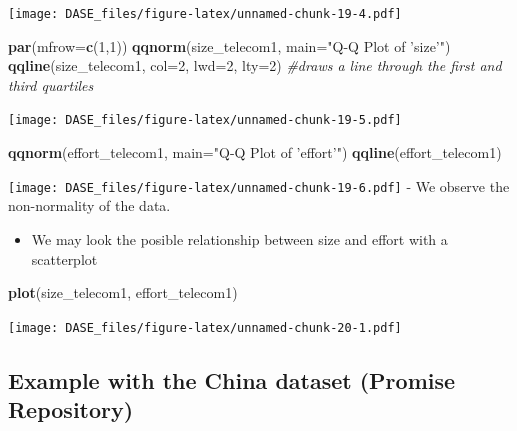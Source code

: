 \documentclass[]{book}
\newenvironment{Shaded}{\begin{snugshade}}{\end{snugshade}}
\newcommand{\KeywordTok}[1]{\textcolor[rgb]{0.13,0.29,0.53}{\textbf{{#1}}}}
\newcommand{\DataTypeTok}[1]{\textcolor[rgb]{0.13,0.29,0.53}{{#1}}}
\newcommand{\DecValTok}[1]{\textcolor[rgb]{0.00,0.00,0.81}{{#1}}}
\newcommand{\StringTok}[1]{\textcolor[rgb]{0.31,0.60,0.02}{{#1}}}
\newcommand{\CommentTok}[1]{\textcolor[rgb]{0.56,0.35,0.01}{\textit{{#1}}}}
\newcommand{\NormalTok}[1]{{#1}}
\providecommand{\tightlist}{%
  \setlength{\itemsep}{0pt}\setlength{\parskip}{0pt}}
\begin{document}
\texttt{[image: DASE\_files/figure-latex/unnamed-chunk-19-4.pdf]}

\begin{Shaded}
\begin{Highlighting}[]
\KeywordTok{par}\NormalTok{(}\DataTypeTok{mfrow=}\KeywordTok{c}\NormalTok{(}\DecValTok{1}\NormalTok{,}\DecValTok{1}\NormalTok{))}
\KeywordTok{qqnorm}\NormalTok{(size_telecom1, }\DataTypeTok{main=}\StringTok{"Q-Q Plot of 'size'"}\NormalTok{)}
\KeywordTok{qqline}\NormalTok{(size_telecom1, }\DataTypeTok{col=}\DecValTok{2}\NormalTok{, }\DataTypeTok{lwd=}\DecValTok{2}\NormalTok{, }\DataTypeTok{lty=}\DecValTok{2}\NormalTok{) }\CommentTok{#draws a line through the first and third quartiles}
\end{Highlighting}
\end{Shaded}

\texttt{[image: DASE\_files/figure-latex/unnamed-chunk-19-5.pdf]}

\begin{Shaded}
\begin{Highlighting}[]
\KeywordTok{qqnorm}\NormalTok{(effort_telecom1,  }\DataTypeTok{main=}\StringTok{"Q-Q Plot of 'effort'"}\NormalTok{)}
\KeywordTok{qqline}\NormalTok{(effort_telecom1)}
\end{Highlighting}
\end{Shaded}

\texttt{[image: DASE\_files/figure-latex/unnamed-chunk-19-6.pdf]} - We
observe the non-normality of the data.

\begin{itemize}
\tightlist
\item
  We may look the posible relationship between size and effort with a
  scatterplot
\end{itemize}

\begin{Shaded}
\begin{Highlighting}[]
\KeywordTok{plot}\NormalTok{(size_telecom1, effort_telecom1)}
\end{Highlighting}
\end{Shaded}

\texttt{[image: DASE\_files/figure-latex/unnamed-chunk-20-1.pdf]}

\subsection{Example with the China dataset (Promise
Repository)}\label{example-with-the-china-dataset-promise-repository}
\end{document}
